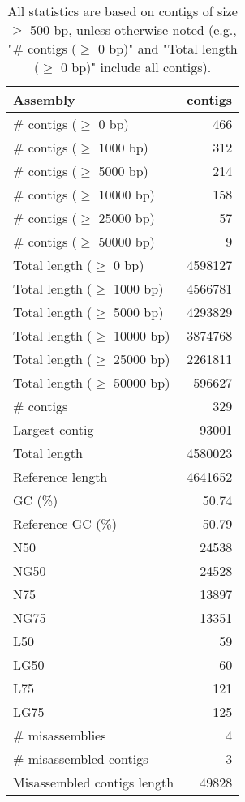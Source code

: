\documentclass[12pt,a4paper]{article}
\begin{document}
\begin{table}[ht]
\begin{center}
\caption{All statistics are based on contigs of size $\geq$ 500 bp, unless otherwise noted (e.g., "\# contigs ($\geq$ 0 bp)" and "Total length ($\geq$ 0 bp)" include all contigs).}
\begin{tabular}{|l*{1}{|r}|}
\hline
Assembly & contigs \\ \hline
\# contigs ($\geq$ 0 bp) & 466 \\ \hline
\# contigs ($\geq$ 1000 bp) & 312 \\ \hline
\# contigs ($\geq$ 5000 bp) & 214 \\ \hline
\# contigs ($\geq$ 10000 bp) & 158 \\ \hline
\# contigs ($\geq$ 25000 bp) & 57 \\ \hline
\# contigs ($\geq$ 50000 bp) & 9 \\ \hline
Total length ($\geq$ 0 bp) & 4598127 \\ \hline
Total length ($\geq$ 1000 bp) & 4566781 \\ \hline
Total length ($\geq$ 5000 bp) & 4293829 \\ \hline
Total length ($\geq$ 10000 bp) & 3874768 \\ \hline
Total length ($\geq$ 25000 bp) & 2261811 \\ \hline
Total length ($\geq$ 50000 bp) & 596627 \\ \hline
\# contigs & 329 \\ \hline
Largest contig & 93001 \\ \hline
Total length & 4580023 \\ \hline
Reference length & 4641652 \\ \hline
GC (\%) & 50.74 \\ \hline
Reference GC (\%) & 50.79 \\ \hline
N50 & 24538 \\ \hline
NG50 & 24528 \\ \hline
N75 & 13897 \\ \hline
NG75 & 13351 \\ \hline
L50 & 59 \\ \hline
LG50 & 60 \\ \hline
L75 & 121 \\ \hline
LG75 & 125 \\ \hline
\# misassemblies & 4 \\ \hline
\# misassembled contigs & 3 \\ \hline
Misassembled contigs length & 49828 \\ \hline

\end{tabular}
\end{center}
\end{table}
\end{document}
